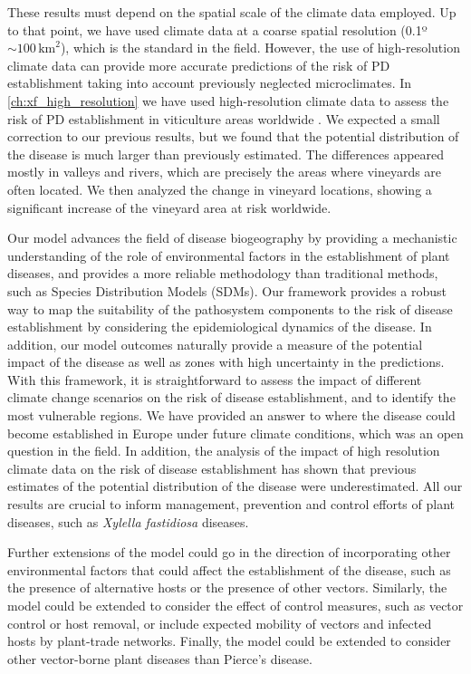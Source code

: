 These results must depend on the spatial scale of the climate data employed. Up
to that point, we have used climate data at a coarse spatial resolution
(0.1º$\sim 100 \, \textrm{km}^2$), which is the standard in the field.
However, the use of high-resolution climate data can provide more accurate
predictions of the risk of PD establishment taking into account previously
neglected microclimates. In \cref{ch:xf_high_resolution} we have used
high-resolution climate data to assess the risk of PD establishment in
viticulture areas worldwide \cite{GimenezRomero2024}. We expected a small
correction to our previous results, but we found that the potential
distribution of the disease is much larger than previously estimated. The
differences appeared mostly in valleys and rivers, which are precisely the
areas where vineyards are often located. We then analyzed the change in
vineyard locations, showing a significant increase of the vineyard area at risk
worldwide.

Our model advances the field of disease biogeography by providing a mechanistic
understanding of the role of environmental factors in the establishment of
plant diseases, and provides a more reliable methodology than traditional
methods, such as Species Distribution Models (SDMs). Our framework
provides a robust way to map the suitability of the pathosystem components to
the risk of disease establishment by considering the  epidemiological dynamics
of the disease. In addition, our model outcomes naturally provide a measure of
the potential impact of the disease as well as zones with high uncertainty in
the predictions. With this framework, it is straightforward to assess the
impact of different climate change scenarios on the risk of disease
establishment, and to identify the most vulnerable regions. We have provided an
answer to where the disease could become established in Europe under future
climate conditions, which was an open question in the field. In addition, the
analysis of the impact of high resolution climate data on the risk of disease
establishment has shown that previous estimates of the potential distribution
of the disease were underestimated. All our results are crucial to inform
management, prevention and control efforts of plant diseases, such as
\textit{Xylella fastidiosa} diseases.

Further extensions of the model could go in the direction of incorporating
other environmental factors that could affect the establishment of the disease,
such as the presence of alternative hosts or the presence of other vectors.
Similarly, the model could be extended to consider the effect of control
measures, such as vector control or host removal, or include expected mobility
of vectors and infected hosts by plant-trade networks. Finally, the model could
be extended to consider other vector-borne plant diseases than Pierce's
disease.

